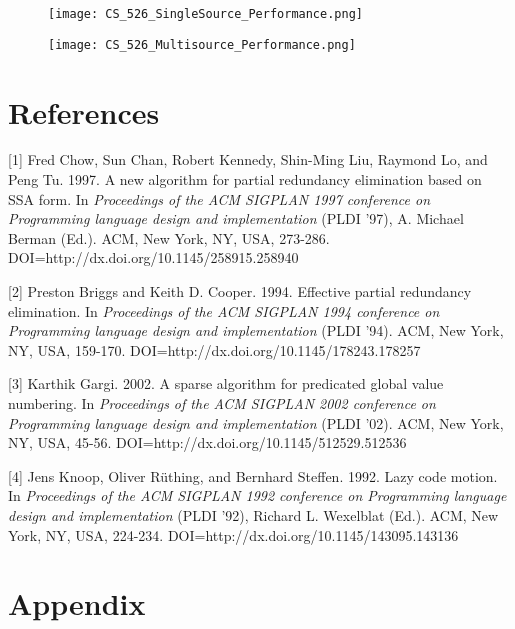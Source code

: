 \documentclass[onecolumn,10pt]{journal}
\begin{document}
\begin{figure}[t] 
\centering
\texttt{[image: CS\_526\_SingleSource\_Performance.png]}
\caption{}
\end{figure}

\begin{figure}[t] 
\centering
\texttt{[image: CS\_526\_Multisource\_Performance.png]}
\caption{}
\end{figure}

\pagebreak
\section{References}

[1] Fred Chow, Sun Chan, Robert Kennedy, Shin-Ming Liu, Raymond Lo, and Peng Tu. 1997. A new algorithm for partial redundancy elimination based on SSA form. In \textit{Proceedings of the ACM SIGPLAN 1997 conference on Programming language design and implementation} (PLDI '97), A. Michael Berman (Ed.). ACM, New York, NY, USA, 273-286. DOI=http://dx.doi.org/10.1145/258915.258940

[2] Preston Briggs and Keith D. Cooper. 1994. Effective partial redundancy elimination. In \textit{Proceedings of the ACM SIGPLAN 1994 conference on Programming language design and implementation} (PLDI '94). ACM, New York, NY, USA, 159-170. DOI=http://dx.doi.org/10.1145/178243.178257

[3] Karthik Gargi. 2002. A sparse algorithm for predicated global value numbering. In \textit{Proceedings of the ACM SIGPLAN 2002 conference on Programming language design and implementation} (PLDI '02). ACM, New York, NY, USA, 45-56. DOI=http://dx.doi.org/10.1145/512529.512536

[4] Jens Knoop, Oliver Rüthing, and Bernhard Steffen. 1992. Lazy code motion. In \textit{Proceedings of the ACM SIGPLAN 1992 conference on Programming language design and implementation} (PLDI '92), Richard L. Wexelblat (Ed.). ACM, New York, NY, USA, 224-234. DOI=http://dx.doi.org/10.1145/143095.143136










\pagebreak
\section{Appendix}
\end{document}
